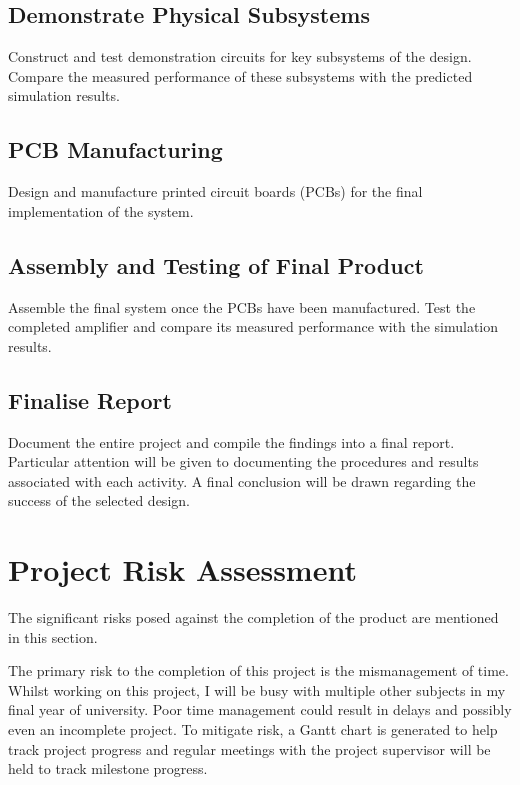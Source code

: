 \documentclass[12pt,a4paper]{report}
\begin{document}
	\subsection{Demonstrate Physical Subsystems}
	
	Construct and test demonstration circuits for key subsystems of the design. Compare the measured performance of these subsystems with the predicted simulation results.
	
	\subsection{PCB Manufacturing}
	
	Design and manufacture printed circuit boards (PCBs) for the final implementation of the system.
	
	\subsection{Assembly and Testing of Final Product}
	
	Assemble the final system once the PCBs have been manufactured. Test the completed amplifier and compare its measured performance with the simulation results.
	
	\subsection{Finalise Report}
	
	Document the entire project and compile the findings into a final report. Particular attention will be given to documenting the procedures and results associated with each activity. A final conclusion will be drawn regarding the success of the selected design.
	
	\section{Project Risk Assessment}
	
	The significant risks posed against the completion of the product are mentioned in this section.
	
	The primary risk to the completion of this project is the mismanagement of time. Whilst working on this project, I will be busy with multiple other subjects in my final year of university. Poor time management could result in delays and possibly even an incomplete project. To mitigate risk, a Gantt chart is generated to help track project progress and regular meetings with the project supervisor will be held to track milestone progress.
	
\end{document}
